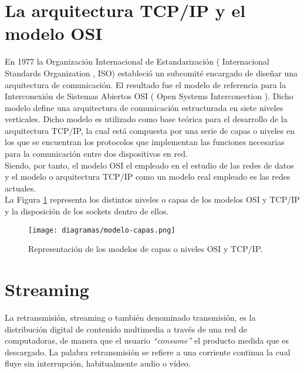 \section{La arquitectura TCP/IP y el modelo OSI}
\label{sec:modelo-osi}

En 1977 la Organización Internacional de Estandarización ( Internacional Standards Organization , ISO) estableció un subcomité encargado de diseñar una arquitectura de
comunicación. El resultado fue el modelo de referencia para la Interconexión de Sistemas Abiertos OSI ( Open Systems Interconection ). Dicho modelo define una arquitectura de
comunicación estructurada en siete niveles verticales. Dicho modelo es utilizado como base teórica para el desarrollo de la arquitectura TCP/IP, la cual está compuesta por una serie de capas
o niveles en los que se encuentran los protocolos que implementan las funciones necesarias para la comunicación entre dos dispositivos en red.\\

Siendo, por tanto, el modelo OSI el empleado en el estudio de las redes de datos y el modelo o arquitectura TCP/IP como un modelo real
empleado es las redes actuales.\\

La Figura \ref{diagram:modelo-osi-tcp} representa los distintos niveles o capas de los modelos OSI y TCP/IP y la disposición de los sockets dentro de ellos.\\

\begin{figure}[H]
  \begin{center}
    \texttt{[image: diagramas/modelo-capas.png]}
  \end{center}
  \caption{ Representación de los modelos de capas o niveles OSI y TCP/IP.}
  \label{diagram:modelo-osi-tcp}
\end{figure}

\section{Streaming}
\label{sec:def-streaming}

La retransmisión, streaming o también denominado transmisión, es la distribución digital de contenido multimedia a través de una red de computadoras, 
de manera que el usuario \emph{``consume''} el producto medida que es descargado. La palabra retransmisión se refiere a una corriente continua la cual fluye sin interrupción,
habitualmente audio o vídeo.\\

